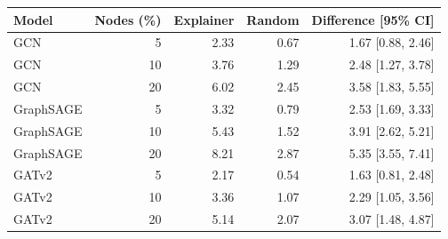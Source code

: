 \begin{tabular}{lrrrr}\toprule Model & Nodes (\%) & Explainer & Random & Difference [95\% CI] \\ \midrule
GCN & 5 & 2.33 & 0.67 & 1.67 [0.88, 2.46] \\
GCN & 10 & 3.76 & 1.29 & 2.48 [1.27, 3.78] \\
GCN & 20 & 6.02 & 2.45 & 3.58 [1.83, 5.55] \\
GraphSAGE & 5 & 3.32 & 0.79 & 2.53 [1.69, 3.33] \\
GraphSAGE & 10 & 5.43 & 1.52 & 3.91 [2.62, 5.21] \\
GraphSAGE & 20 & 8.21 & 2.87 & 5.35 [3.55, 7.41] \\
GATv2 & 5 & 2.17 & 0.54 & 1.63 [0.81, 2.48] \\
GATv2 & 10 & 3.36 & 1.07 & 2.29 [1.05, 3.56] \\
GATv2 & 20 & 5.14 & 2.07 & 3.07 [1.48, 4.87] \\
\bottomrule
\end{tabular}
